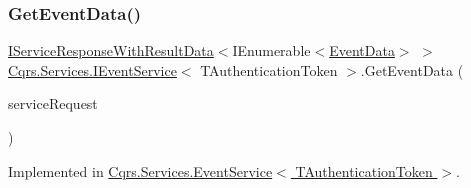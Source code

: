 \subsubsection{\texorpdfstring{Get\+Event\+Data()}{GetEventData()}}
{\footnotesize\ttfamily \hyperlink{interfaceCqrs_1_1Services_1_1IServiceResponseWithResultData}{I\+Service\+Response\+With\+Result\+Data}$<$I\+Enumerable$<$\hyperlink{classCqrs_1_1Events_1_1EventData}{Event\+Data}$>$ $>$ \hyperlink{interfaceCqrs_1_1Services_1_1IEventService}{Cqrs.\+Services.\+I\+Event\+Service}$<$ T\+Authentication\+Token $>$.Get\+Event\+Data (\begin{DoxyParamCaption}\item[{\hyperlink{interfaceCqrs_1_1Services_1_1IServiceRequestWithData}{I\+Service\+Request\+With\+Data}$<$ T\+Authentication\+Token, Guid $>$}]{service\+Request }\end{DoxyParamCaption})}



Implemented in \hyperlink{classCqrs_1_1Services_1_1EventService_a9a68d774ac754e39be56d3e0449f14d7_a9a68d774ac754e39be56d3e0449f14d7}{Cqrs.\+Services.\+Event\+Service$<$ T\+Authentication\+Token $>$}.

